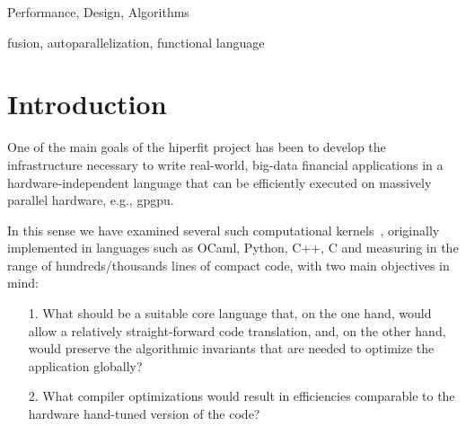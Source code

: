 \documentclass{sigplanconf}  %
\begin{document}


\terms
Performance, Design, Algorithms

\keywords
fusion, autoparallelization, functional language

\section{Introduction}
\label{sec:Introduction}



One of the main goals of the {\sc hiperfit} project has been to
develop the infrastructure necessary to write real-world, big-data 
financial applications in a hardware-independent language that can 
be efficiently executed on massively parallel hardware, e.g., {\sc gpgpu}.  %

In this sense we have examined several such computational kernels~\cite{PricingFHPC}, 
originally implemented in languages such as OCaml, Python, C++, C
and measuring in the range of hundreds/thousands lines of compact code, 
with two main objectives in mind: 
\begin{itemize}
    \item[1.] What should be a suitable core language that, on the
                one hand, would allow a relatively straight-forward 
                code translation, and, on the other hand, would
                preserve the algorithmic invariants that are needed
                to optimize the application globally?
    \item[2.] What compiler optimizations would result in efficiencies
                comparable to the hardware hand-tuned version 
                of the code?
\end{itemize}
\end{document}
